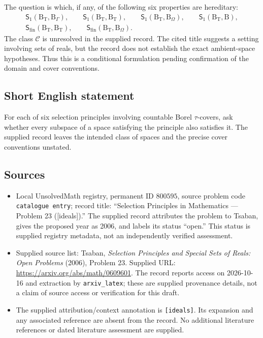 \documentclass[11pt]{article}
\begin{document}
The question is which, if any, of the following six properties are hereditary:
\[
\begin{gathered}
\mathsf S_1(\mathrm B_{\mathrm T},\mathrm B_\Gamma),\qquad
\mathsf S_1(\mathrm B_{\mathrm T},\mathrm B_{\mathrm T}),\qquad
\mathsf S_1(\mathrm B_{\mathrm T},\mathrm B_\Omega),\qquad
\mathsf S_1(\mathrm B_{\mathrm T},\mathrm B),\\
\mathsf S_{\mathrm{fin}}(\mathrm B_{\mathrm T},\mathrm B_{\mathrm T}),\qquad
\mathsf S_{\mathrm{fin}}(\mathrm B_{\mathrm T},\mathrm B_\Omega).
\end{gathered}
\]
The class \(\mathcal C\) is unresolved in the supplied record. The cited title suggests a setting involving sets of reals, but the record does not establish the exact ambient-space hypotheses. Thus this is a conditional formulation pending confirmation of the domain and cover conventions.
\subsection{Short English statement}
For each of six selection principles involving countable Borel \(\tau\)-covers, ask whether every subspace of a space satisfying the principle also satisfies it. The supplied record leaves the intended class of spaces and the precise cover conventions unstated.
\subsection{Sources}
\begin{itemize}
\item Local UnsolvedMath registry, permanent ID \(800595\), source problem code \texttt{catalogue entry}; record title: ``Selection Principles in Mathematics --- Problem 23 ([ideals]).'' The supplied record attributes the problem to Tsaban, gives the proposed year as 2006, and labels its status ``open.'' This status is supplied registry metadata, not an independently verified assessment.
\item Supplied source list: Tsaban, \emph{Selection Principles and Special Sets of Reals: Open Problems} (2006), Problem 23. Supplied URL: \url{https://arxiv.org/abs/math/0609601}. The record reports access on 2026-10-16 and extraction by \texttt{arxiv\_latex}; these are supplied provenance details, not a claim of source access or verification for this draft.
\item The supplied attribution/context annotation is \texttt{[ideals]}. Its expansion and any associated reference are absent from the record. No additional literature references or dated literature assessment are supplied.
\end{itemize}
\end{document}
